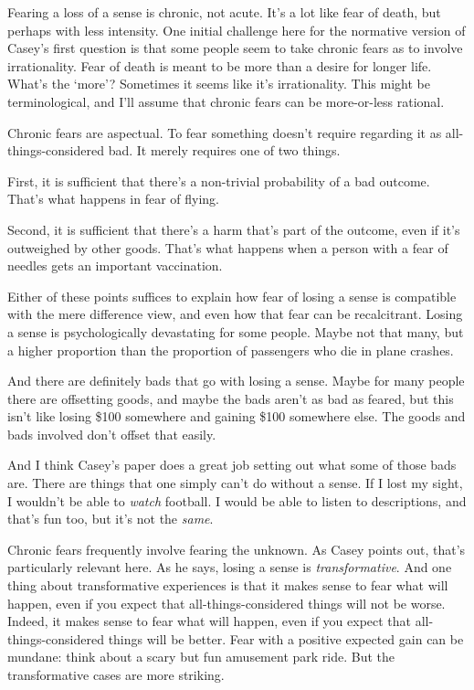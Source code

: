 \documentclass[
  11pt,
  letterpaper,
  DIV=11,
  numbers=noendperiod,
  oneside]{scrartcl}
\begin{document}
Fearing a loss of a sense is chronic, not acute. It's a lot like fear of
death, but perhaps with less intensity. One initial challenge here for
the normative version of Casey's first question is that some people seem
to take chronic fears as to involve irrationality. Fear of death is
meant to be more than a desire for longer life. What's the `more'?
Sometimes it seems like it's irrationality. This might be
terminological, and I'll assume that chronic fears can be more-or-less
rational.

Chronic fears are aspectual. To fear something doesn't require regarding
it as all-things-considered bad. It merely requires one of two things.

First, it is sufficient that there's a non-trivial probability of a bad
outcome. That's what happens in fear of flying.

Second, it is sufficient that there's a harm that's part of the outcome,
even if it's outweighed by other goods. That's what happens when a
person with a fear of needles gets an important vaccination.

Either of these points suffices to explain how fear of losing a sense is
compatible with the mere difference view, and even how that fear can be
recalcitrant. Losing a sense is psychologically devastating for some
people. Maybe not that many, but a higher proportion than the proportion
of passengers who die in plane crashes.

And there are definitely bads that go with losing a sense. Maybe for
many people there are offsetting goods, and maybe the bads aren't as bad
as feared, but this isn't like losing \$100 somewhere and gaining \$100
somewhere else. The goods and bads involved don't offset that easily.

And I think Casey's paper does a great job setting out what some of
those bads are. There are things that one simply can't do without a
sense. If I lost my sight, I wouldn't be able to \emph{watch} football.
I would be able to listen to descriptions, and that's fun too, but it's
not the \emph{same}.

Chronic fears frequently involve fearing the unknown. As Casey points
out, that's particularly relevant here. As he says, losing a sense is
\emph{transformative}. And one thing about transformative experiences is
that it makes sense to fear what will happen, even if you expect that
all-things-considered things will not be worse. Indeed, it makes sense
to fear what will happen, even if you expect that all-things-considered
things will be better. Fear with a positive expected gain can be
mundane: think about a scary but fun amusement park ride. But the
transformative cases are more striking.
\end{document}
